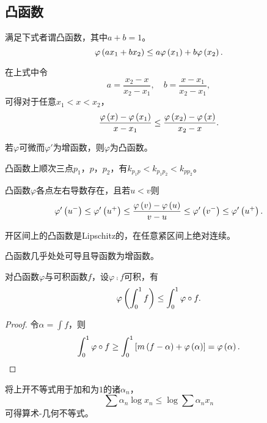 \documentclass{ctexrep}
\begin{document}
  \subsection{凸函数}
  \begin{definition}
    满足下式者谓凸函数，其中$a+b=1$。
    \[ \varphi\left(a x_1 + b x_2\right) \le a \varphi\left(x_1\right) + b \varphi\left(x_2\right). \]
  \end{definition}
  在上式中令
  \[ a=\frac{x_2-x}{x_2-x_1},\quad b=\frac{x-x_1}{x_2-x_1}, \]
  可得对于任意$x_1<x<x_2$，
  \[ \frac{\varphi\left(x\right)-\varphi\left(x_1\right)}{x-x_1} \le \frac{\varphi\left(x_2\right)-\varphi\left(x\right)}{x_2-x}. \]
  \begin{proposition}
    若$\varphi$可微而$\varphi'$为增函数，则$\varphi$为凸函数。
  \end{proposition}
  \begin{lemma}[弦斜率]
    凸函数上顺次三点$p_1$，$p$，$p_2$，有$k_{p_1p}<k_{p_1p_2}<k_{pp_2}$。
  \end{lemma}
  \begin{lemma}
    凸函数$\varphi$各点左右导数存在，且若$u<v$则
    \[ \varphi'\left(u^-\right) \le \varphi'\left(u^+\right)\le\frac{\varphi\left(v\right)-\varphi\left(u\right)}{v-u}\le\varphi'\left(v^-\right)\le\varphi'\left(u^+\right). \]
  \end{lemma}
  \begin{collary}
    开区间上的凸函数是Lipschitz的，在任意紧区间上绝对连续。
  \end{collary}
  \begin{theorem}
    凸函数几乎处处可导且导函数为增函数。
  \end{theorem}
  \begin{theorem}[Jensen不等式]
    对凸函数$\varphi$与可积函数$f$，设$\varphi\comp f$可积，有
    \[ \varphi\left(\int_0^1 f\right) \le \int_0^1 \varphi\circ f. \]
  \end{theorem}
  \begin{proof}
    令$\alpha=\int f$，则
    \[ \int_0^1 \varphi\circ f \ge \int_0^1 \left[m\left(f-\alpha\right)+\varphi\left(\alpha\right)\right] = \varphi\left(\alpha\right). \qedhere \]
  \end{proof}
  将上开不等式用于加和为$1$的诸$\alpha_n$，
  \[ \sum \alpha_n \log x_n \le \log \sum \alpha_n x_n \]
  可得算术-几何不等式。
  
 
\ifx\allfiles\undefined %
\end{document}
